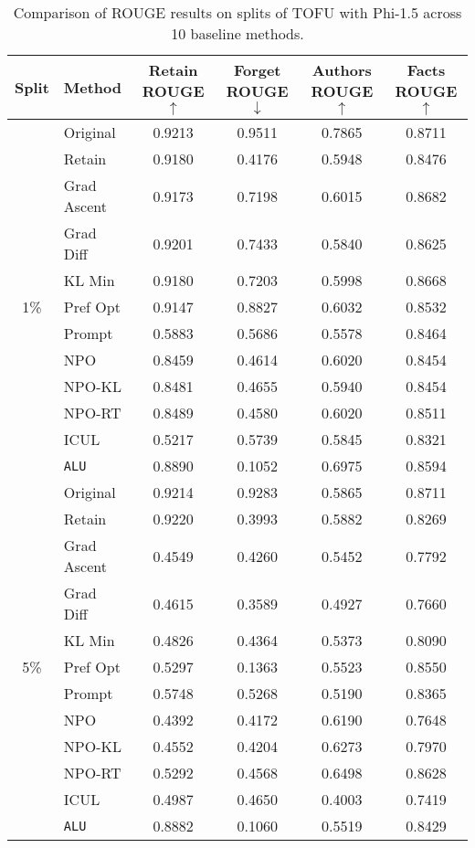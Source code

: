\begin{table*}
    \centering
    \caption{Comparison of ROUGE results on splits of TOFU with Phi-1.5 across 10 baseline methods.}
    \begin{tabular}{cl|cccc}
    \toprule
    \textbf{Split}&\textbf{Method}&\textbf{Retain ROUGE} $\uparrow$ &\textbf{Forget ROUGE} $\downarrow$ &\textbf{Authors ROUGE} $\uparrow$ &\textbf{Facts ROUGE} $\uparrow$ \\
    \midrule
    & Original & 0.9213 & 0.9511 & 0.7865 & 0.8711 \\
    & Retain & 0.9180 & 0.4176 & 0.5948 & 0.8476 \\
    & Grad Ascent & 0.9173 & 0.7198 & 0.6015 & 0.8682 \\
    & Grad Diff & 0.9201 & 0.7433 & 0.5840 & 0.8625 \\
    & KL Min & 0.9180 & 0.7203 & 0.5998 & 0.8668 \\
    1\% & Pref Opt & 0.9147 & 0.8827 & 0.6032 & 0.8532 \\
    & Prompt & 0.5883 & 0.5686 & 0.5578 & 0.8464 \\
    & NPO & 0.8459 & 0.4614 & 0.6020 & 0.8454 \\
    & NPO-KL & 0.8481 & 0.4655 & 0.5940 & 0.8454 \\
    & NPO-RT & 0.8489 & 0.4580 & 0.6020 & 0.8511 \\
    & ICUL & 0.5217 & 0.5739 & 0.5845 & 0.8321\\
    & \texttt{ALU} & 0.8890 & 0.1052 & 0.6975 & 0.8594\\
    \midrule
    & Original & 0.9214 & 0.9283 & 0.5865 & 0.8711 \\
    & Retain & 0.9220 & 0.3993 & 0.5882 & 0.8269 \\
    & Grad Ascent & 0.4549 & 0.4260 & 0.5452 & 0.7792 \\
    & Grad Diff & 0.4615 & 0.3589 & 0.4927 & 0.7660 \\
    & KL Min & 0.4826 & 0.4364 & 0.5373 & 0.8090 \\
    5\% & Pref Opt & 0.5297 & 0.1363 & 0.5523 & 0.8550 \\
    & Prompt & 0.5748 & 0.5268 & 0.5190 & 0.8365 \\
    & NPO & 0.4392 & 0.4172 & 0.6190 & 0.7648 \\
    & NPO-KL & 0.4552 & 0.4204 & 0.6273 & 0.7970 \\
    & NPO-RT & 0.5292 & 0.4568 & 0.6498 & 0.8628 \\
    & ICUL & 0.4987 & 0.4650 & 0.4003 & 0.7419\\
    & \texttt{ALU} & 0.8882 & 0.1060 & 0.5519 & 0.8429\\

    \bottomrule
    
         
         
    \end{tabular}
    \label{tab:t31}
\end{table*}


